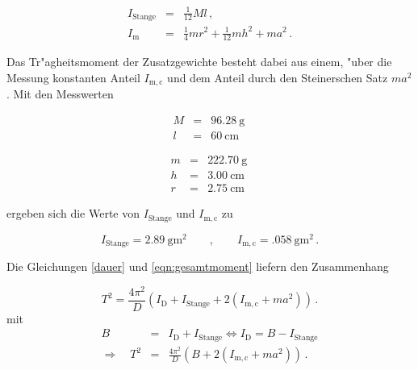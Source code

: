 		\begin{eqnarray*}
			I_\mathrm{Stange} & = & \frac{1}{12} M l \,, \\
			I_\mathrm{m} & = & \frac{1}{4}mr^2 + \frac{1}{12}mh^2 + ma^2 \,.
		\end{eqnarray*}

		Das Tr"agheitsmoment der Zusatzgewichte besteht dabei aus einem, "uber die Messung konstanten Anteil $I_\mathrm{m,c}$ und dem Anteil durch den Steinerschen Satz $ma^2$.
		Mit den Messwerten
		
		\begin{figure}[h!]
			\begin{minipage}[t]{7cm}
				\begin{eqnarray*}
					M & = & \SI{96.28}{\gram} \, \\
					l & = & \SI{60}{\centi \meter} \,
				\end{eqnarray*}
			\end{minipage}
			\hfill
			\begin{minipage}[t]{7cm}
				\begin{eqnarray*}
					m & = & \SI{222.70}{\gram} \, \\
					h & = & \SI{3.00}{\centi \meter} \, \\
					r & = & \SI{2.75}{\centi \meter} \,
				\end{eqnarray*}
			\end{minipage}
		\end{figure}

		ergeben sich die Werte von $I_\mathrm{Stange}$ und $I_\mathrm{m,c}$ zu

		\begin{equation*}
			I_\mathrm{Stange} = \SI{2.89}{\gram \meter \squared} \qquad , \qquad I_\mathrm{m,c} = \SI{.058}{\gram \meter \squared} \,.
		\end{equation*}

		Die Gleichungen \eqref{dauer} und \eqref{eqn:gesamtmoment} liefern den Zusammenhang

		\begin{equation*}
			T^2 = \frac{4 \pi^2}{D} \left(I_\mathrm{D} + I_\mathrm{Stange} + 2\left(I_\mathrm{m,c} + ma^2 \right)\right) \,.
		\end{equation*}
		mit
		\begin{eqnarray*}
			B & = & I_\mathrm{D} + I_\mathrm{Stange} \Leftrightarrow I_\mathrm{D} = B - I_\mathrm{Stange} \\
			\Rightarrow \quad T^2 & = & \frac{4\pi^2}{D}\left(B + 2\left(I_\mathrm{m,c} + ma^2\right)\right) \,.
		\end{eqnarray*}


